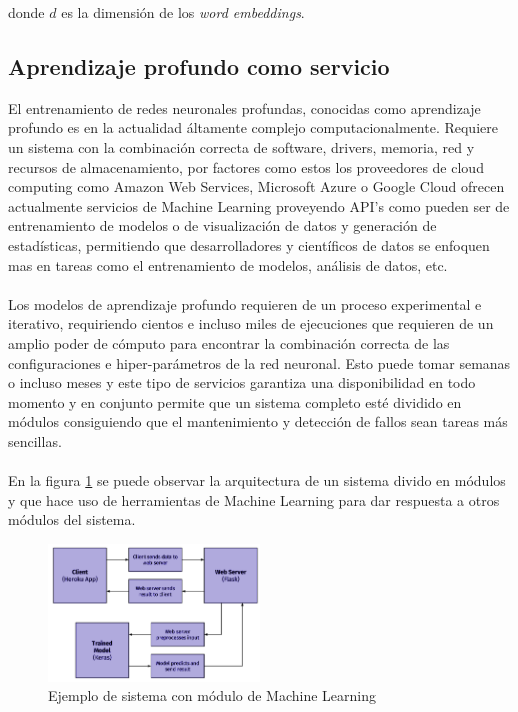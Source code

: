 	donde $d$ es la dimensión de los \textit{word embeddings}.

\subsection{Aprendizaje profundo como servicio}
El entrenamiento de redes neuronales profundas, conocidas como aprendizaje profundo es en la actualidad áltamente complejo computacionalmente. Requiere un sistema con la combinación correcta de software, drivers, memoria, red y recursos de almacenamiento, por factores como estos los proveedores de cloud computing como Amazon Web Services, Microsoft Azure o Google Cloud ofrecen actualmente servicios de Machine Learning proveyendo API's como pueden ser de entrenamiento de modelos o de visualización de datos y generación de estadísticas, permitiendo que desarrolladores y científicos de datos se enfoquen mas en tareas como el entrenamiento de modelos, análisis de datos, etc.
\\\\
Los modelos de aprendizaje profundo requieren de un proceso experimental e iterativo, requiriendo cientos e incluso miles de ejecuciones que requieren de un amplio poder de cómputo para encontrar la combinación correcta de las configuraciones e hiper-parámetros de la red neuronal. Esto puede tomar semanas o incluso meses y este tipo de servicios garantiza una disponibilidad en todo momento y en conjunto permite que un sistema completo esté dividido en módulos consiguiendo que el mantenimiento y detección de fallos sean tareas más sencillas.
\\\\ 
En la figura \ref{fig:DLAAS} se puede observar la arquitectura de un sistema divido en módulos y que hace uso de herramientas de Machine Learning para dar respuesta a otros módulos del sistema.

\begin{figure}[H]
	\centering
	\includegraphics[width=0.5\textwidth]{capitulo2/images/DLAAS.png}
	\caption{Ejemplo de sistema con módulo de Machine Learning}
	\label{fig:DLAAS}
\end{figure}

